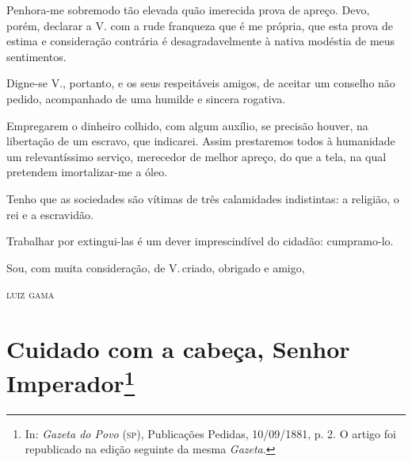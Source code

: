 Penhora-me sobremodo tão elevada quão imerecida prova de apreço. Devo,
porém, declarar a V. com a rude franqueza que é me própria, que esta
prova de estima e consideração contrária é desagradavelmente à nativa
modéstia de meus sentimentos.

Digne-se V., portanto, e os seus respeitáveis amigos, de aceitar um
conselho não pedido, acompanhado de uma humilde e sincera rogativa.

Empregarem o dinheiro colhido, com algum auxílio, se precisão houver, na
libertação de um escravo, que indicarei. Assim prestaremos todos à
humanidade um relevantíssimo serviço, merecedor de melhor apreço, do que
a tela, na qual pretendem imortalizar-me a óleo.

Tenho que as sociedades são vítimas de três calamidades indistintas: a
religião, o rei e a escravidão.

Trabalhar por extingui-las é um dever imprescindível do cidadão:
cumpramo-lo.

Sou, com muita consideração, de V.\,criado, obrigado e amigo,\medskip

\hfill\textsc{luiz gama}

\chapter{Cuidado com a cabeça, Senhor Imperador\footnote{In:
  \emph{Gazeta do Povo} (\textsc{sp}), Publicações Pedidas, 10/09/1881, p. 2. O
  artigo foi republicado na edição seguinte da mesma \emph{Gazeta}.}}

